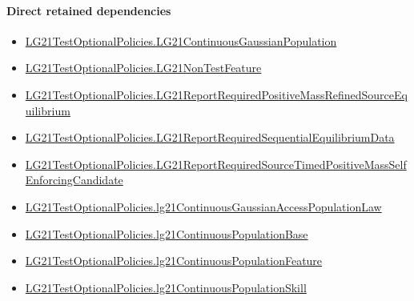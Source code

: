 \documentclass[10pt]{article}
\begin{document}
\paragraph{Direct retained dependencies}
\begin{itemize}\raggedright
\item \hyperlink{paper-prerequisite-f5e1c886d250142b}{LG21\allowbreak{}Test\allowbreak{}Optional\allowbreak{}Policies.\allowbreak{}LG21\allowbreak{}Continuous\allowbreak{}Gaussian\allowbreak{}Population}
\item \hyperlink{governing-declaration-81cb73bf3869c56d}{LG21\allowbreak{}Test\allowbreak{}Optional\allowbreak{}Policies.\allowbreak{}LG21\allowbreak{}Non\allowbreak{}Test\allowbreak{}Feature}
\item \hyperlink{governing-declaration-f947776cd95aec9b}{LG21\allowbreak{}Test\allowbreak{}Optional\allowbreak{}Policies.\allowbreak{}LG21\allowbreak{}Report\allowbreak{}Required\allowbreak{}Positive\allowbreak{}Mass\allowbreak{}Refined\allowbreak{}Source\allowbreak{}Equilibrium}
\item \hyperlink{governing-declaration-b4426f8407925151}{LG21\allowbreak{}Test\allowbreak{}Optional\allowbreak{}Policies.\allowbreak{}LG21\allowbreak{}Report\allowbreak{}Required\allowbreak{}Sequential\allowbreak{}Equilibrium\allowbreak{}Data}
\item \hyperlink{governing-declaration-f6661ead15dc1cc9}{LG21\allowbreak{}Test\allowbreak{}Optional\allowbreak{}Policies.\allowbreak{}LG21\allowbreak{}Report\allowbreak{}Required\allowbreak{}Source\allowbreak{}Timed\allowbreak{}Positive\allowbreak{}Mass\allowbreak{}Self\allowbreak{}Enforcing\allowbreak{}Candidate}
\item \hyperlink{governing-declaration-fa49b6c4b938413f}{LG21\allowbreak{}Test\allowbreak{}Optional\allowbreak{}Policies.\allowbreak{}lg21\allowbreak{}Continuous\allowbreak{}Gaussian\allowbreak{}Access\allowbreak{}Population\allowbreak{}Law}
\item \hyperlink{governing-declaration-3b5146b167dee236}{LG21\allowbreak{}Test\allowbreak{}Optional\allowbreak{}Policies.\allowbreak{}lg21\allowbreak{}Continuous\allowbreak{}Population\allowbreak{}Base}
\item \hyperlink{governing-declaration-f07391974a356bb7}{LG21\allowbreak{}Test\allowbreak{}Optional\allowbreak{}Policies.\allowbreak{}lg21\allowbreak{}Continuous\allowbreak{}Population\allowbreak{}Feature}
\item \hyperlink{governing-declaration-339ce55dcb78dfb9}{LG21\allowbreak{}Test\allowbreak{}Optional\allowbreak{}Policies.\allowbreak{}lg21\allowbreak{}Continuous\allowbreak{}Population\allowbreak{}Skill}
\end{itemize}
\hypertarget{governing-declaration-a4ca58af5822aaeb}{}
\end{document}
